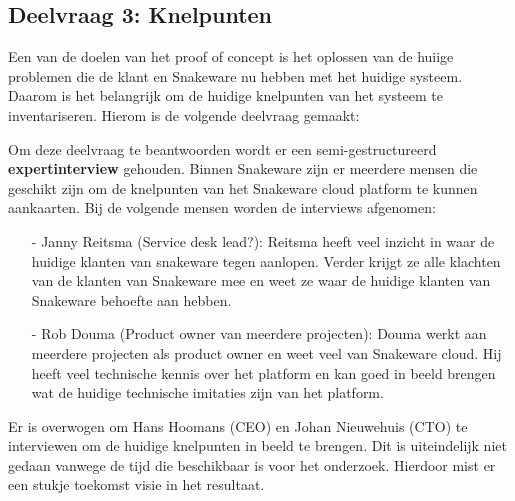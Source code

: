 \subsection{Deelvraag 3: Knelpunten}
Een van de doelen van het proof of concept is het oplossen van de huiige problemen die de klant en Snakeware nu hebben met het huidige systeem.
Daarom is het belangrijk om de huidige knelpunten van het systeem te inventariseren.
Hierom is de volgende deelvraag gemaakt:

%
%
\begin{center}
    \textit{\SubquestionThree}
\end{center}

\whitespace[0.2]
Om deze deelvraag te beantwoorden wordt er een semi-gestructureerd \textbf{expertinterview} gehouden.
Binnen Snakeware zijn er meerdere mensen die geschikt zijn om de knelpunten van het Snakeware cloud platform te kunnen aankaarten.
Bij de volgende mensen worden de interviews afgenomen:
\begin{itemize}
    \item[-] Janny Reitsma (Service desk lead?): Reitsma heeft veel inzicht in waar de huidige klanten van snakeware tegen aanlopen.
        Verder krijgt ze alle klachten van de klanten van Snakeware mee en weet ze waar de huidige klanten van Snakeware behoefte aan hebben.
    \item[-] Rob Douma (Product owner van meerdere projecten): Douma werkt aan meerdere projecten als product owner en weet veel van Snakeware cloud.
        Hij heeft veel technische kennis over het platform en kan goed in beeld brengen wat de huidige technische imitaties zijn van het platform.
\end{itemize}

\whitespace
Er is overwogen om Hans Hoomans (CEO) en Johan Nieuwehuis (CTO) te interviewen om de huidige knelpunten in beeld te brengen.
Dit is uiteindelijk niet gedaan vanwege de tijd die beschikbaar is voor het onderzoek.
Hierdoor mist er een stukje toekomst visie in het resultaat.
